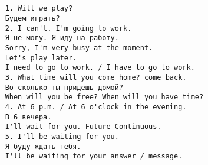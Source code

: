 \subsection*{}
\begin{verbatim}
    1. Will we play?
    Будем играть?
    2. I can't. I'm going to work.
    Я не могу. Я иду на работу.
    Sorry, I'm very busy at the moment.
    Let's play later.
    I need to go to work. / I have to go to work.
    3. What time will you come home? come back.
    Во сколько ты придешь домой?
    When will you be free? When will you have time?
    4. At 6 p.m. / At 6 o'clock in the evening.
    В 6 вечера.
    I'll wait for you. Future Continuous.
    5. I'll be waiting for you.
    Я буду ждать тебя.
    I'll be waiting for your answer / message.
\end{verbatim}